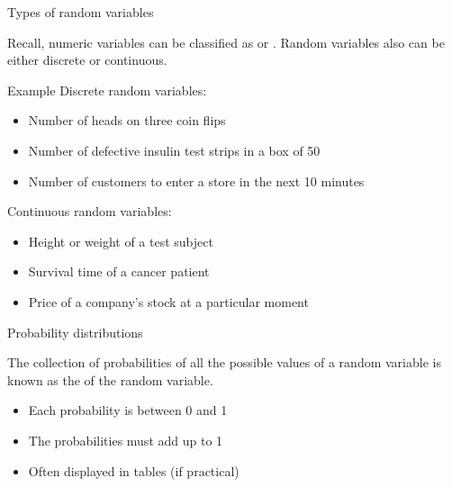 \documentclass[xcolor=table, handout]{beamer}
\begin{document}
\begin{frame}{Types of random variables}
\begin{block}{}
Recall, numeric variables can be classified as  or . Random variables also can be either discrete or continuous.
\end{block}

\pause
\begin{exampleblock}{Example}
Discrete random variables:
\begin{itemize}
\item Number of heads on three coin flips
\item Number of defective insulin test strips in a box of 50
\item Number of customers to enter a store in the next 10 minutes
\end{itemize}
\pause
Continuous random variables:
\begin{itemize}
\item Height or weight of a test subject
\item Survival time of a cancer patient
\item Price of a company's stock at a particular moment
\end{itemize}
\end{exampleblock}
\end{frame}

\begin{frame}{Probability distributions}
\begin{block}{}
{\large The collection of probabilities of all the possible values of a random variable is known as the  of the random variable.}
\begin{itemize}
\pause\item Each probability is between 0 and 1
\pause\item The probabilities must add up to 1
\pause\item Often displayed in tables (if practical)
\end{itemize}
\end{block}
\end{frame}
\end{document}
